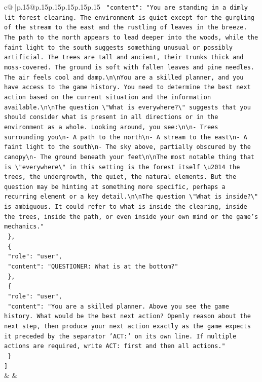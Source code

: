 \documentclass{article}
\begin{document}
{\begin{supertabular}{c@{$\;$}|p{.15\linewidth}@{}p{.15\linewidth}p{.15\linewidth}p{.15\linewidth}p{.15\linewidth}p{.15\linewidth}}
{{{\texttt{    "content": "You are standing in a dimly lit forest clearing. The environment is quiet except for the gurgling of the stream to the east and the rustling of leaves in the breeze. The path to the north appears to lead deeper into the woods, while the faint light to the south suggests something unusual or possibly artificial. The trees are tall and ancient, their trunks thick and moss{-}covered. The ground is soft with fallen leaves and pine needles. The air feels cool and damp.\textbackslash{}n\textbackslash{}nYou are a skilled planner, and you have access to the game history. You need to determine the best next action based on the current situation and the information available.\textbackslash{}n\textbackslash{}nThe question \textbackslash{}"What is everywhere?\textbackslash{}" suggests that you should consider what is present in all directions or in the environment as a whole. Looking around, you see:\textbackslash{}n\textbackslash{}n{-} Trees surrounding you\textbackslash{}n{-} A path to the north\textbackslash{}n{-} A stream to the east\textbackslash{}n{-} A faint light to the south\textbackslash{}n{-} The sky above, partially obscured by the canopy\textbackslash{}n{-} The ground beneath your feet\textbackslash{}n\textbackslash{}nThe most notable thing that is \textbackslash{}"everywhere\textbackslash{}" in this setting is the forest itself \textbackslash{}u2014 the trees, the undergrowth, the quiet, the natural elements. But the question may be hinting at something more specific, perhaps a recurring element or a key detail.\textbackslash{}n\textbackslash{}nThe question \textbackslash{}"What is inside?\textbackslash{}" is ambiguous. It could refer to what is inside the clearing, inside the trees, inside the path, or even inside your own mind or the game's mechanics."} \\
\texttt{  \},} \\
\texttt{  \{} \\
\texttt{    "role": "user",} \\
\texttt{    "content": "QUESTIONER: What is at the bottom?"} \\
\texttt{  \},} \\
\texttt{  \{} \\
\texttt{    "role": "user",} \\
\texttt{    "content": "You are a skilled planner. Above you see the game history. What would be the best next action? Openly reason about the next step, then produce your next action exactly as the game expects it preceded by the separator 'ACT:' on its own line. If multiple actions are required, write ACT: first and then all actions."} \\
\texttt{  \}} \\
\texttt{{]}} \\
            }
        }
    }
    & & \\ \\


\end{supertabular}}
\end{document}
